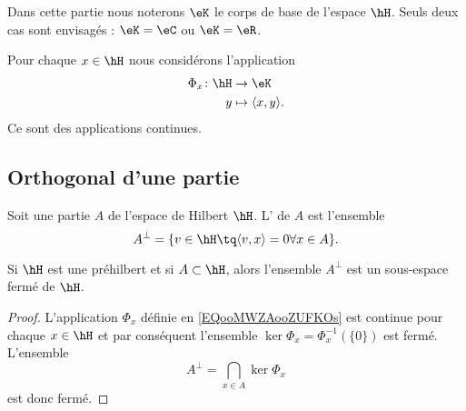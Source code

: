 Dans cette partie nous noterons \( \eK\) le corps de base de l'espace \( \hH\). Seuls deux cas sont envisagés : \( \eK=\eC\) ou \( \eK=\eR\).

Pour chaque \( x\in\hH\) nous considérons l'application
\begin{equation}        \label{EQooMWZAooZUFKOs}
    \begin{aligned}
        \Phi_x\colon \hH&\to \eK \\
        y&\mapsto \langle x, y\rangle .
    \end{aligned}
\end{equation}
Ce sont des applications continues.

\subsection{Orthogonal d'une partie}

\begin{definition}  \label{DEFooXUXQooMmDnhW}
    Soit une partie \( A\) de l'espace de Hilbert \( \hH\). L' de \( A\) est l'ensemble
    \begin{equation}
        A^{\perp}=\{ v\in\hH\tq \langle v, x\rangle =0\forall x\in A \}.
    \end{equation}
\end{definition}

\begin{proposition}     \label{PropdpaMpH}
    Si \( \hH\) est une préhilbert et si \( A\subset \hH\), alors l'ensemble \( A^{\perp}\) est un sous-espace fermé de \( \hH\).
\end{proposition}

\begin{proof}
    L'application \( \Phi_x\) définie en \eqref{EQooMWZAooZUFKOs} est continue pour chaque \( x\in\hH\) et par conséquent l'ensemble \( \ker\Phi_x=\Phi_x^{-1}(\{ 0 \})\) est fermé. L'ensemble
    \begin{equation}
        A^{\perp}=\bigcap_{x\in A}\ker\Phi_x
    \end{equation}
    est donc fermé.
\end{proof}

